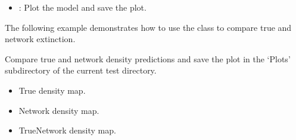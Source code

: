 \documentclass[letterpaper,10pt,english]{sphinxmanual}
\begin{document}
\begin{fulllineitems}
\begin{description}
\begin{itemize}
\item {} 
\sphinxAtStartPar
{}: Plot the model and save the plot.

\end{itemize}

\sphinxAtStartPar
The following example demonstrates how to use the  class to compare true and network extinction.

\begin{sphinxVerbatim}[commandchars=\\\{\}]
    
\end{sphinxVerbatim}

\end{description}

\begin{fulllineitems}
\label{\detokenize{Visualizer:Visualizer.Visualizer.compare_densities}}
\pysigstartsignatures
{}
\pysigstopsignatures
\sphinxAtStartPar
Compare true and network density predictions and save the plot in the ‘Plots’ subdirectory of the current
test directory.
\begin{description}
\begin{itemize}
\item {} 
\sphinxAtStartPar
True density map.

\item {} 
\sphinxAtStartPar
Network density map.

\item {} 
\sphinxAtStartPar
True\sphinxhyphen{}Network density map.

\end{itemize}

\end{description}

\end{fulllineitems}



\end{fulllineitems}
\end{document}
